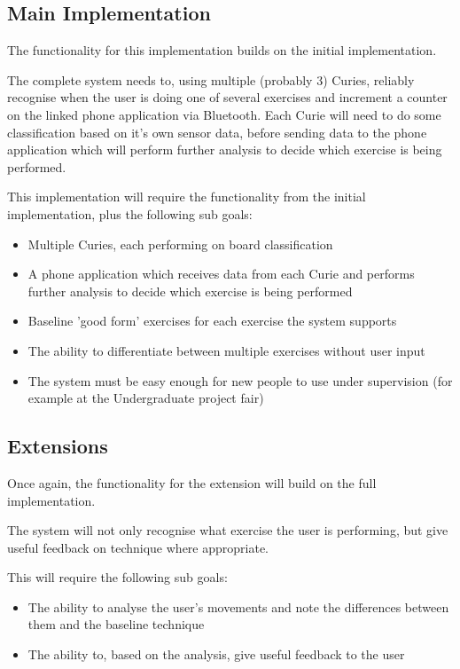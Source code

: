 \documentclass[a4paper]{article}
\begin{document}
\subsection{Main Implementation}%

The functionality for this implementation builds on the initial implementation. 

The complete system needs to, using multiple (probably 3) Curies, reliably recognise when the user is doing one of several exercises and increment a counter on the linked phone application via Bluetooth. Each Curie will need to do some classification based on it's own sensor data, before sending data to the phone application which will perform further analysis to decide which exercise is being performed. 

This implementation will require the functionality from the initial implementation, plus the following sub goals:

\begin{itemize}
    \item Multiple Curies, each performing on board classification
    \item A phone application which receives data from each Curie and performs further analysis to decide which exercise is being performed
    \item Baseline 'good form' exercises for each exercise the system supports
    \item The ability to differentiate between multiple exercises without user input
    \item The system must be easy enough for new people to use under supervision (for example at the Undergraduate project fair)
\end{itemize}

\subsection{Extensions}%

Once again, the functionality for the extension will build on the full implementation.

The system will not only recognise what exercise the user is performing, but give useful feedback on technique where appropriate.

This will require the following sub goals:

\begin{itemize}
    \item The ability to analyse the user's movements and note the differences between them and the baseline technique
    \item The ability to, based on the analysis, give useful feedback to the user
\end{itemize}
\end{document}
